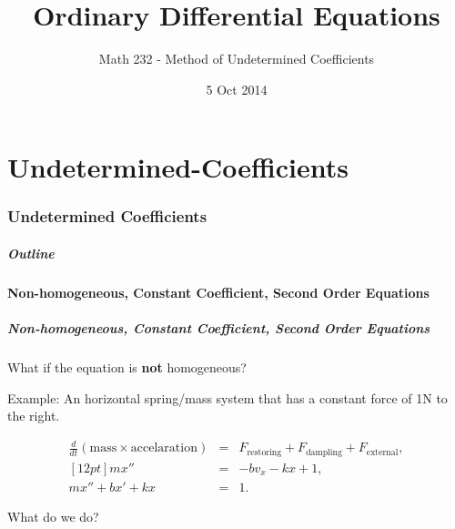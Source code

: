 \part{Undetermined-Coefficients}
\section{Undetermined Coefficients}

\title{Ordinary Differential Equations}
\subtitle{Math 232 - Method of Undetermined Coefficients}
\date{5 Oct 2014}

\begin{frame}
  \titlepage
\end{frame}

\begin{frame}
  \frametitle{Outline}
  \tableofcontents[ currentsection ]
\end{frame}


\subsection{Non-homogeneous, Constant Coefficient, Second Order Equations}


\begin{frame}
  \frametitle{Non-homogeneous, Constant Coefficient, Second Order
    Equations}
  What if the equation is \textbf{not} homogeneous?

  Example: An horizontal spring/mass system that has a constant force
  of 1N to the right.

  \begin{eqnarray*}
    \frac{d}{dt} \left( \mathrm{mass} \times \mathrm{accelaration} \right) & = & 
      F_{\text{restoring}} + F_{\text{dampling}} + F_{\text{external}}, \\ [12pt]
    m x'' & = & -b v_x - kx + 1, \\
    m x'' + bx' + kx & = & 1.
  \end{eqnarray*}

  What do we do?


\end{frame}


